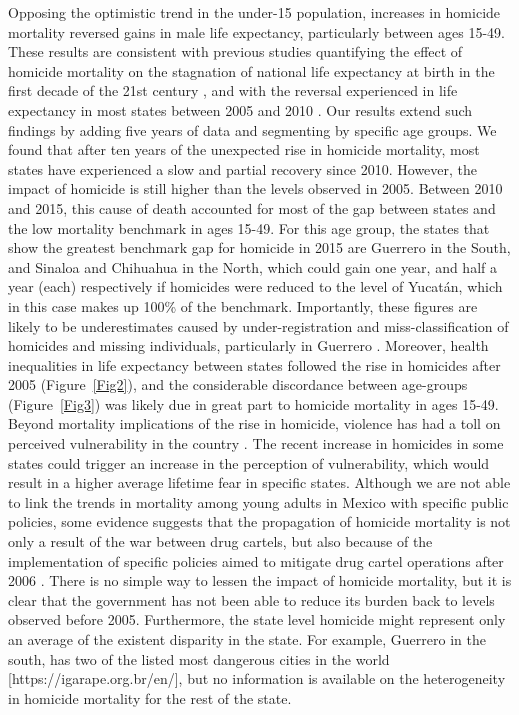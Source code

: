 \documentclass{bmcart}
\begin{document}
Opposing the optimistic trend in the under-15 population, increases in homicide mortality reversed gains in male life expectancy, particularly between ages 15-49. These results are consistent with previous studies quantifying the effect of homicide mortality on the stagnation of national life expectancy at birth in the first decade of the 21st century \cite{canudas2014}, and with the reversal experienced in life expectancy in most states between 2005 and 2010 \cite{Aburto2015}. Our results extend such findings by adding five years of data and segmenting by specific age groups. We found that after ten years of the unexpected rise in homicide mortality, most states have experienced a slow and partial recovery since 2010. However, the impact of homicide is still higher than the levels observed in 2005. Between 2010 and 2015, this cause of death accounted for most of the gap between states and the low mortality benchmark in ages 15-49. For this age group, the states that show the greatest benchmark gap for homicide in 2015 are Guerrero in the South, and Sinaloa and Chihuahua in the North, which could gain one year, and half a year (each) respectively if homicides were reduced to the level of Yucat\'an, which in this case makes up 100\% of the benchmark. Importantly, these figures are likely to be underestimates caused by under-registration and miss-classification of homicides and missing individuals, particularly in Guerrero \cite{HRW2011,wright2017epistemological}. Moreover, health inequalities in life expectancy between states followed the rise in homicides after 2005 (Figure~\ref{Fig2}), and the considerable discordance between age-groups (Figure~\ref{Fig3}) was likely due in great part to homicide mortality in ages 15-49.
Beyond mortality implications of the rise in homicide, violence has had a toll on perceived vulnerability in the country \cite{canudas2017Mexico}. The recent increase in homicides in some states could trigger an increase in the perception of vulnerability, which would result in a higher average lifetime fear in specific states. Although we are not able to link the trends in mortality among young adults in Mexico with specific public policies, some evidence suggests that the propagation of homicide mortality is not only a result of the war between drug cartels, but also because of the implementation of specific policies aimed to mitigate drug cartel operations after 2006 \cite{espinal2015analysis}.
There is no simple way to lessen the impact of homicide mortality, but it is clear that the government has not been able to reduce its burden back to levels observed before 2005. Furthermore, the state level homicide might represent only an average of the existent disparity in the state. For example, Guerrero in the south, has two of the listed most dangerous cities in the world [https://igarape.org.br/en/], but no information is available on the heterogeneity in homicide mortality for the rest of the state.
\end{document}
